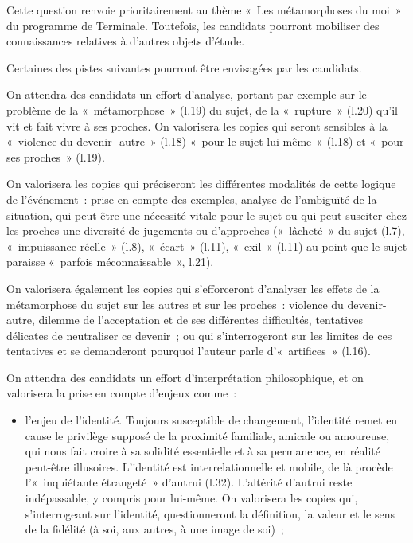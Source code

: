 		{Cette question renvoie prioritairement au thème «~Les métamorphoses du moi~» du
programme de Terminale. Toutefois, les candidats pourront mobiliser des
connaissances relatives à d'autres objets d'étude.

Certaines des pistes suivantes pourront être envisagées par les candidats.

On attendra des candidats un effort d'analyse, portant par exemple sur le problème de
la «~métamorphose~» (l.19) du sujet, de la «~rupture~» (l.20) qu'il vit et fait vivre à ses
proches. On valorisera les copies qui seront sensibles à la «~violence du devenir-
autre~» (l.18) «~pour le sujet lui-même~» (l.18) et «~pour ses proches~» (l.19).

On valorisera les copies qui préciseront les différentes modalités de cette logique de
l'événement~: prise en compte des exemples, analyse de l'ambiguïté de la situation,
qui peut être une nécessité vitale pour le sujet ou qui peut susciter chez les proches
une diversité de jugements ou d'approches («~lâcheté~» du sujet (l.7), «~impuissance
réelle~» (l.8), «~écart~» (l.11), «~exil~» (l.11) au point que le sujet paraisse «~parfois
méconnaissable~», l.21).

On valorisera également les copies qui s'efforceront d'analyser les effets de la
métamorphose du sujet sur les autres et sur les proches~: violence du devenir-autre,
dilemme de l'acceptation et de ses différentes difficultés, tentatives délicates de neutraliser ce devenir~; ou qui s'interrogeront sur les limites de ces tentatives et se
demanderont pourquoi l'auteur parle d'«~artifices~» (l.16).

On attendra des candidats un effort d'interprétation philosophique, et on valorisera la
prise en compte d'enjeux comme~:

\begin{itemize}

\item l'enjeu de l'identité. Toujours susceptible de changement, l'identité remet en cause
le privilège supposé de la proximité familiale, amicale ou amoureuse, qui nous fait
croire à sa solidité essentielle et à sa permanence, en réalité peut-être illusoires.
L'identité est interrelationnelle et mobile, de là procède l'«~inquiétante étrangeté~»
d'autrui (l.32). L'altérité d'autrui reste indépassable, y compris pour lui-même. On
valorisera les copies qui, s'interrogeant sur l'identité, questionneront la définition, la
valeur et le sens de la fidélité (à soi, aux autres, à une image de soi)~;


\end{itemize}}
